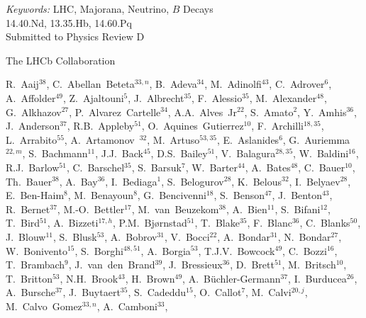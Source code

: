 \documentclass[12pt,a4paper]{article}
\begin{document}
\begin{titlepage}
\begin{abstract}
\end{abstract}

\vspace*{2.0cm}
\vspace{\fill}

\vspace*{1.0cm}
{\it Keywords:} LHC, Majorana, Neutrino, $B$ Decays\\
\hspace*{6mm}{\it PACS:} 14.40.Nd, 13.35.Hb, 14.60.Pq \\
\hspace*{6mm}Submitted to Physics Review D\\
\newpage
\begin{center}
The LHCb Collaboration\\
\begin{flushleft}
\small
R.~Aaij$^{38}$, 
C.~Abellan~Beteta$^{33,n}$, 
B.~Adeva$^{34}$, 
M.~Adinolfi$^{43}$, 
C.~Adrover$^{6}$, 
A.~Affolder$^{49}$, 
Z.~Ajaltouni$^{5}$, 
J.~Albrecht$^{35}$, 
F.~Alessio$^{35}$, 
M.~Alexander$^{48}$, 
G.~Alkhazov$^{27}$, 
P.~Alvarez~Cartelle$^{34}$, 
A.A.~Alves~Jr$^{22}$, 
S.~Amato$^{2}$, 
Y.~Amhis$^{36}$, 
J.~Anderson$^{37}$, 
R.B.~Appleby$^{51}$, 
O.~Aquines~Gutierrez$^{10}$, 
F.~Archilli$^{18,35}$, 
L.~Arrabito$^{55}$, 
A.~Artamonov~$^{32}$, 
M.~Artuso$^{53,35}$, 
E.~Aslanides$^{6}$, 
G.~Auriemma$^{22,m}$, 
S.~Bachmann$^{11}$, 
J.J.~Back$^{45}$, 
D.S.~Bailey$^{51}$, 
V.~Balagura$^{28,35}$, 
W.~Baldini$^{16}$, 
R.J.~Barlow$^{51}$, 
C.~Barschel$^{35}$, 
S.~Barsuk$^{7}$, 
W.~Barter$^{44}$, 
A.~Bates$^{48}$, 
C.~Bauer$^{10}$, 
Th.~Bauer$^{38}$, 
A.~Bay$^{36}$, 
I.~Bediaga$^{1}$, 
S.~Belogurov$^{28}$, 
K.~Belous$^{32}$, 
I.~Belyaev$^{28}$, 
E.~Ben-Haim$^{8}$, 
M.~Benayoun$^{8}$, 
G.~Bencivenni$^{18}$, 
S.~Benson$^{47}$, 
J.~Benton$^{43}$, 
R.~Bernet$^{37}$, 
M.-O.~Bettler$^{17}$, 
M.~van~Beuzekom$^{38}$, 
A.~Bien$^{11}$, 
S.~Bifani$^{12}$, 
T.~Bird$^{51}$, 
A.~Bizzeti$^{17,h}$, 
P.M.~Bj\o rnstad$^{51}$, 
T.~Blake$^{35}$, 
F.~Blanc$^{36}$, 
C.~Blanks$^{50}$, 
J.~Blouw$^{11}$, 
S.~Blusk$^{53}$, 
A.~Bobrov$^{31}$, 
V.~Bocci$^{22}$, 
A.~Bondar$^{31}$, 
N.~Bondar$^{27}$, 
W.~Bonivento$^{15}$, 
S.~Borghi$^{48,51}$, 
A.~Borgia$^{53}$, 
T.J.V.~Bowcock$^{49}$, 
C.~Bozzi$^{16}$, 
T.~Brambach$^{9}$, 
J.~van~den~Brand$^{39}$, 
J.~Bressieux$^{36}$, 
D.~Brett$^{51}$, 
M.~Britsch$^{10}$, 
T.~Britton$^{53}$, 
N.H.~Brook$^{43}$, 
H.~Brown$^{49}$, 
A.~B\"{u}chler-Germann$^{37}$, 
I.~Burducea$^{26}$, 
A.~Bursche$^{37}$, 
J.~Buytaert$^{35}$, 
S.~Cadeddu$^{15}$, 
O.~Callot$^{7}$, 
M.~Calvi$^{20,j}$, 
M.~Calvo~Gomez$^{33,n}$, 
A.~Camboni$^{33}$, 

\end{flushleft}
\end{center}
\end{titlepage}
\end{document}
